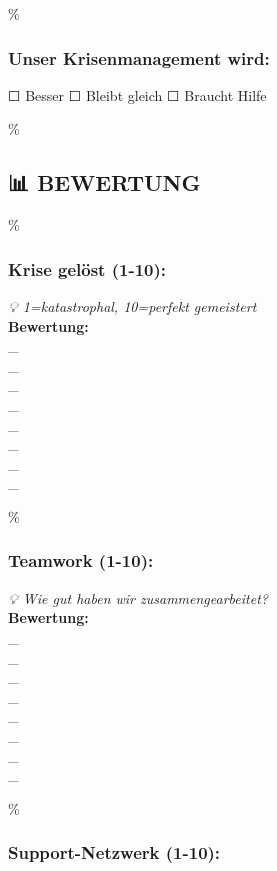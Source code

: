 \hypertarget{unser-krisenmanagement-wird}{\%
\subsubsection{\texorpdfstring{\textbf{Unser Krisenmanagement wird:}}{Unser Krisenmanagement wird:}}\label{unser-krisenmanagement-wird}}

☐ Besser ☐ Bleibt gleich ☐ Braucht Hilfe

\hypertarget{bewertung}{\%
\subsection{\texorpdfstring{\textbf{📊 BEWERTUNG}}{📊 BEWERTUNG}}\label{bewertung}}

\hypertarget{krise-geluxf6st-1-10}{\%
\subsubsection{\texorpdfstring{\textbf{Krise gelöst (1-10):}}{Krise gelöst (1-10):}}\label{krise-geluxf6st-1-10}}

\emph{💡 1=katastrophal, 10=perfekt gemeistert}\\
\textbf{Bewertung:} \\_\\_\\_\\_\\_\\_\\_\\_

\hypertarget{teamwork-1-10}{\%
\subsubsection{\texorpdfstring{\textbf{Teamwork (1-10):}}{Teamwork (1-10):}}\label{teamwork-1-10}}

\emph{💡 Wie gut haben wir zusammengearbeitet?}\\
\textbf{Bewertung:} \\_\\_\\_\\_\\_\\_\\_\\_

\hypertarget{support-netzwerk-1-10}{\%
\subsubsection{\texorpdfstring{\textbf{Support-Netzwerk (1-10):}}{Support-Netzwerk (1-10):}}\label{support-netzwerk-1-10}}

